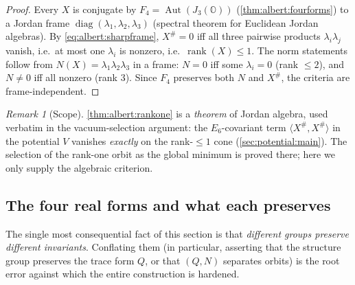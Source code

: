 \documentclass[11pt]{article}
\theoremstyle{plain}
\theoremstyle{definition}
\theoremstyle{remark}
\newtheorem{remark}[theorem]{Remark}
\begin{document}
\begin{proof}
Every $X$ is conjugate by $F_{4}=\operatorname{Aut}(J_{3}(\mathbb{O}))$
(\autoref{thm:albert:fourforms}) to a Jordan frame
$\operatorname{diag}(\lambda_{1},\lambda_{2},\lambda_{3})$
(spectral theorem for Euclidean Jordan algebras). By
\eqref{eq:albert:sharpframe}, $X^{\#}=0$ iff all three pairwise products
$\lambda_{i}\lambda_{j}$ vanish, i.e.\ at most one $\lambda_{i}$ is
nonzero, i.e.\ $\operatorname{rank}(X)\le1$. The norm statements follow
from $N(X)=\lambda_{1}\lambda_{2}\lambda_{3}$ in a frame: $N=0$ iff some
$\lambda_{i}=0$ (rank $\le 2$), and $N\neq0$ iff all nonzero (rank $3$).
Since $F_{4}$ preserves both $N$ and $X^{\#}$, the criteria are
frame-independent.
\end{proof}

\begin{remark}[Scope]\label{rmk:albert:scope}
\autoref{thm:albert:rankone} is a \emph{theorem} of Jordan algebra, used
verbatim in the vacuum-selection argument: the $E_{6}$-covariant term
$\langle X^{\#},X^{\#}\rangle$ in the potential $V$ vanishes
\emph{exactly} on the rank-$\le1$ cone (\autoref{sec:potential:main}).
The selection of the rank-one orbit as the global minimum is proved
there; here we only supply the algebraic criterion.
\end{remark}

\subsection{The four real forms and what each preserves}
\label{sec:albert:groups}
\label{sec:realform:main}

The single most consequential fact of this section is that
\emph{different groups preserve different invariants}. Conflating them
(in particular, asserting that the structure group preserves the trace
form $Q$, or that $(Q,N)$ separates orbits) is the root error against
which the entire construction is hardened.
\end{document}
